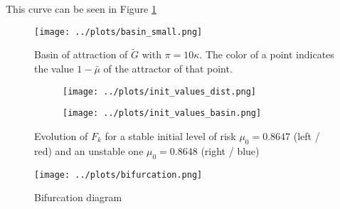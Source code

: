 \documentclass[../../main.tex]{subfiles}
\begin{document}
This curve can be seen in Figure \ref{fig:two-dimensional:basin} 

\begin{figure}[H]
  \centering
  \texttt{[image: ../plots/basin\_small.png]}
  \caption{Basin of attraction of $\tilde{G}$ with $\pi = 10 \kappa$. The color of a point indicates the value $1 - \bar{\mu}$ of the attractor of that point.}
  \label{fig:two-dimensional:basin}
\end{figure}

\begin{figure}[H]
  \begin{subfigure}{\textwidth}
    \centering
    \texttt{[image: ../plots/init\_values\_dist.png]}
  \end{subfigure}
  
  \bigskip
  \centering
  \begin{subfigure}{0.5\textwidth}
    \centering
    \texttt{[image: ../plots/init\_values\_basin.png]} 
  \end{subfigure}

  \caption{Evolution of $F_k$ for a stable initial level of risk $\mu_0 = 0.8647$ (left / red) and an unstable one $\mu_0 = 0.8648$ (right / blue)}  
  \label{fig:small-init}
\end{figure}


\begin{figure}[H]
  \centering
  \texttt{[image: ../plots/bifurcation.png]}
  \caption{Bifurcation diagram }
  \label{fig:two-dimensional:bifurcation}
\end{figure}
\end{document}
